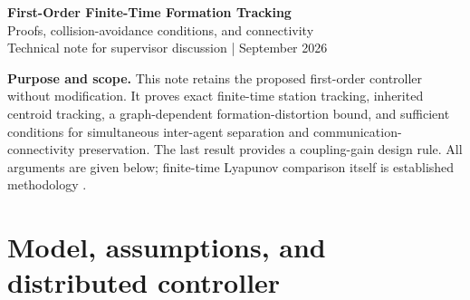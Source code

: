 \documentclass[11pt,a4paper]{article}
\theoremstyle{remark}
\begin{document}
\begin{center}
{\LARGE\bfseries\color{accent} First-Order Finite-Time Formation Tracking}\\[5pt]
{\large Proofs, collision-avoidance conditions, and connectivity}\\[4pt]
{\small Technical note for supervisor discussion \enspace| September 2026}
\end{center}
\vspace{1mm}

\textbf{Purpose and scope.}
This note retains the proposed first-order controller without modification. It proves exact finite-time station tracking, inherited centroid tracking, a graph-dependent formation-distortion bound, and sufficient conditions for simultaneous inter-agent separation and communication-connectivity preservation. The last result provides a coupling-gain design rule. All arguments are given below; finite-time Lyapunov comparison itself is established methodology \cite{bhat00}.

\section{Model, assumptions, and distributed controller}
\end{document}
